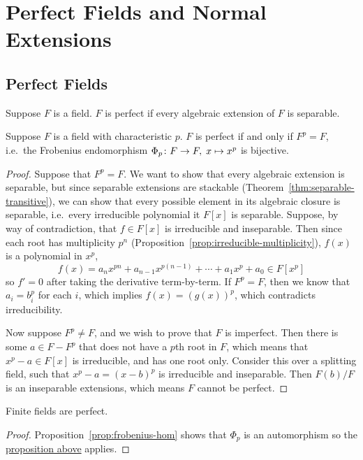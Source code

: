 

\section{Perfect Fields and Normal Extensions}

\subsection*{Perfect Fields}

\begin{definition}
    Suppose \(F\) is a field.
    \(F\) is perfect if every algebraic extension of \(F\) is separable.
\end{definition}
\begin{proposition}\label{prop:perfect-frobenius-bijective}
    Suppose \(F\) is a field with characteristic \(p\).
    \(F\) is perfect if and only if \(F^p = F\),
    i.e.\ the Frobenius endomorphism \(\Phi_p\colon F\to F,\;x\mapsto x^p\) is bijective.
\end{proposition}
\begin{proof}
    Suppose that \(F^p = F\).
    We want to show that every algebraic extension is separable,
    but since separable extensions are stackable (Theorem~\ref{thm:separable-transitive}),
    we can show that every possible element in its algebraic closure is separable,
    i.e.\ every irreducible polynomial it \(F[x]\) is separable.
    Suppose, by way of contradiction, that \(f \in F[x]\) is irreducible and inseparable.
    Then since each root has multiplicity \(p^n\) (Proposition~\ref{prop:irreducible-multiplicity}),
    \(f(x)\) is a polynomial in \(x^p\),
    \begin{equation*}
        f(x) = a_n x^{pn} + a_{n-1} x^{p(n-1)} + \cdots + a_1 x^p + a_0 \in F[x^p]
    \end{equation*}
    so \(f' = 0\) after taking the derivative term-by-term.
    If \(F^p = F\), then we know that \(a_i = b_i^p\) for each \(i\),
    which implies \(f(x) = {(g(x))}^p\), which contradicts irreducibility.

    Now suppose \(F^p \neq F\), and we wish to prove that \(F\) is imperfect.
    Then there is some \(a \in F - F^p\) that does not have a \(p\)th root in \(F\),
    which means that \(x^p - a \in F[x]\) is irreducible, and has one root only.
    Consider this over a splitting field,
    such that \(x^p - a = {(x-b)}^p\) is irreducible and inseparable.
    Then \(F(b)/F\) is an inseparable extensions, which means \(F\) cannot be perfect.
\end{proof}
\begin{corollary}
    Finite fields are perfect.
\end{corollary}
\begin{proof}
    Proposition~\ref{prop:frobenius-hom} shows that \(\Phi_p\) is an automorphism
    so the \hyperref[prop:perfect-frobenius-bijective]{proposition above} applies.
\end{proof}

